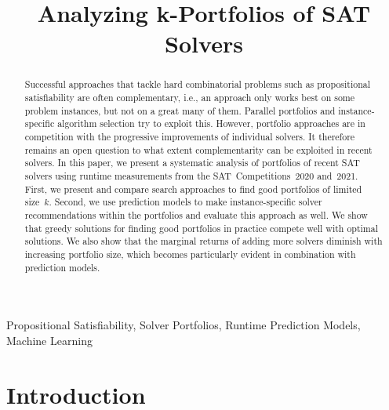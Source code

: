 \documentclass[conference]{IEEEtran}
\begin{document}
\title{Analyzing k-Portfolios of SAT Solvers}

\author{
\and
{}
}

\maketitle

\begin{abstract}
Successful approaches that tackle hard combinatorial problems such as propositional satisfiability are often complementary, i.e., an approach only works best on some problem instances, but not on a great many of them. 
Parallel portfolios and instance-specific algorithm selection try to exploit this.
However, portfolio approaches are in competition with the progressive improvements of individual solvers.
It therefore remains an open question to what extent complementarity can be exploited in recent solvers. 
In this paper, we present a systematic analysis of portfolios of recent SAT solvers using runtime measurements from the SAT~Competitions~2020 and~2021. 
First, we present and compare search approaches to find good portfolios of limited size~$k$.
Second, we use prediction models to make instance-specific solver recommendations within the portfolios and evaluate this approach as well.
We show that greedy solutions for finding good portfolios in practice compete well with optimal solutions. 
We also show that the marginal returns of adding more solvers diminish with increasing portfolio size, which becomes particularly evident in combination with prediction models.
\end{abstract}

\begin{IEEEkeywords}
Propositional Satisfiability, Solver Portfolios, Runtime Prediction Models, Machine Learning
\end{IEEEkeywords}

\section{Introduction}
\label{sec:introduction}
\end{document}
